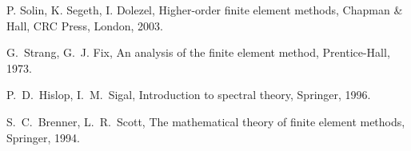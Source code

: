 \documentclass[smallextended]{svjour3}
\begin{document}
\begin{thebibliography}{10}
{\sc P. Solin, K. Segeth, I. Dolezel,}
{ Higher-order finite element methods},
Chapman \& Hall, CRC Press, London, 2003.

{\sc G.~Strang, G.~J. Fix},
 { An analysis of the finite element method},
 Prentice-Hall, 1973.
 
{\sc P.~D.~Hislop, I.~M.~Sigal},
 { Introduction to spectral theory},
 Springer, 1996.
 
{\sc S.~C.~Brenner, L.~R.~Scott},
 { The mathematical theory of finite element methods},
 Springer, 1994.

\end{thebibliography} 
\end{document}
